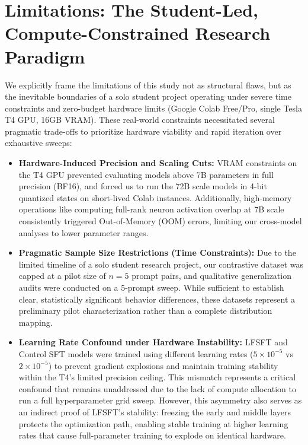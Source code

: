 \documentclass[11pt]{article}
\begin{document}
\section{Limitations: The Student-Led, Compute-Constrained Research Paradigm}
\label{sec:limitations}

We explicitly frame the limitations of this study not as structural flaws, but as the inevitable boundaries of a solo student project operating under severe time constraints and zero-budget hardware limits (Google Colab Free/Pro, single Tesla T4 GPU, 16GB VRAM). These real-world constraints necessitated several pragmatic trade-offs to prioritize hardware viability and rapid iteration over exhaustive sweeps:

\begin{itemize}
    \item \textbf{Hardware-Induced Precision and Scaling Cuts:} VRAM constraints on the T4 GPU prevented evaluating models above 7B parameters in full precision (BF16), and forced us to run the 72B scale models in 4-bit quantized states on short-lived Colab instances. Additionally, high-memory operations like computing full-rank neuron activation overlap at 7B scale consistently triggered Out-of-Memory (OOM) errors, limiting our cross-model analyses to lower parameter ranges.
    \item \textbf{Pragmatic Sample Size Restrictions (Time Constraints):} Due to the limited timeline of a solo student research project, our contrastive dataset was capped at a pilot size of $n=5$ prompt pairs, and qualitative generalization audits were conducted on a 5-prompt sweep. While sufficient to establish clear, statistically significant behavior differences, these datasets represent a preliminary pilot characterization rather than a complete distribution mapping.
    \item \textbf{Learning Rate Confound under Hardware Instability:} LFSFT and Control SFT models were trained using different learning rates ($5 \times 10^{-5}$ vs $2 \times 10^{-5}$) to prevent gradient explosions and maintain training stability within the T4's limited precision ceiling. This mismatch represents a critical confound that remains unaddressed due to the lack of compute allocation to run a full hyperparameter grid sweep. However, this asymmetry also serves as an indirect proof of LFSFT's stability: freezing the early and middle layers protects the optimization path, enabling stable training at higher learning rates that cause full-parameter training to explode on identical hardware.
\end{itemize}
\end{document}
